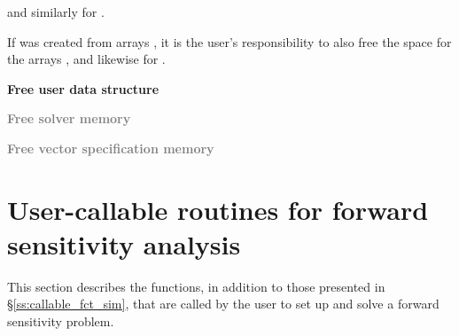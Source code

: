 \begin{Steps}
  {\s} 

  {\omp} 

  {\pt} 

  {\p} 

  and similarly for .

  If  was created from  arrays , it is the
  user's responsibility to also free the space for the arrays ,
  and likewise for .

\item
  {\bf Free user data structure}

\item
  \textcolor{gray}{\bf Free solver memory}
  
\item
  \textcolor{gray}{\bf Free vector specification memory}

\end{Steps}

\section{User-callable routines for forward sensitivity analysis}

This section describes the {\idas} functions, in addition to those presented
in \S\ref{ss:callable_fct_sim}, that are called by the user to set up and solve
a forward sensitivity problem.

